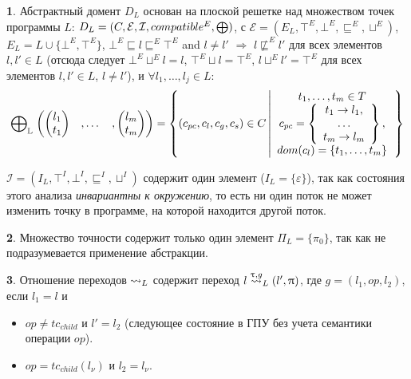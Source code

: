 {\textbf 1.} Абстрактный домент $D_L$ основан на плоской решетке над множеством точек программы $L$: 
$D_L = (C, \mathcal{E}, \mathcal{I}, compatible^E, \mathrel{\bigoplus})$, с $\mathcal{E}=(E_L, \top^E, \bot^E, \sqsubseteq^E, \sqcup^E)$, $E_L= L \cup \{\bot^E,\top^E\}$, $\bot^E \sqsubseteq l \sqsubseteq^E \top^E$ and $l \neq l'$ $\Rightarrow$ $l \not\sqsubseteq^E l'$ для всех элементов $l, l' \in L$ 
(отсюда следует $\bot^E \sqcup^E l = l$, $\top^E \sqcup l=\top^E$, $ l\sqcup^E l' = \top^E$ для всех элементов $l,l'\in L$, $l\neq l'$), 
и
$\forall l_1, \dots, l_j \in L:$
\begin{equation}
\label{location_epp_def}
\begin{aligned}
\mathrel{\bigoplus}_{\mathbb{L}}
\begin{pmatrix}
\begin{pmatrix}
l_1 \\
t_1 
\end{pmatrix}& ,
\dots& ,
\begin{pmatrix}
l_m \\
t_m 
\end{pmatrix}
\end{pmatrix} = 
\left\lbrace (c_{pc},c_l,c_g,c_s) \in C 
\left| 
\begin{array}{c}
t_1, \dots, t_m \in T\\
c_{pc} = 
\left\lbrace
\begin{array}{c}
t_1 \to l_1,\\
\dots\\
t_m \to l_m\\
\end{array}
\right\rbrace, \\
dom(c_l) = \{t_1, \dots, t_m\}\\
\end{array}
\right.
\right\rbrace\\
\end{aligned}
\end{equation}

$\mathcal{I}=(I_L, \top^I, \bot^I, \sqsubseteq^I, \sqcup^I)$ содержит один элемент ($I_L=\{\varepsilon\}$), так как состояния этого анализа {\em инвариантны к окружению}, то есть ни один поток не может изменить точку в программе, на которой находится другой поток.

{\textbf 2.} Множество точности содержит только один элемент $\Pi_L = \{\pi_0\}$, так как не подразумевается применение абстракции.

{\textbf 3.} Отношение переходов $\leadsto_L$ содержит переход $l \stackrel{\uptau, g}{\leadsto}_L (l', \uppi)$, где $g=(l_1,op,l_2)$, если $l_1 = l$ и
\begin{itemize}
\item $op \neq tc_{child}$ и $l' = l_2$ (следующее состояние в ГПУ без учета семантики операции $op$). 
\item $op=tc_{child}(l_\nu)$ и $l_2 = l_\nu$. 
\end{itemize}

